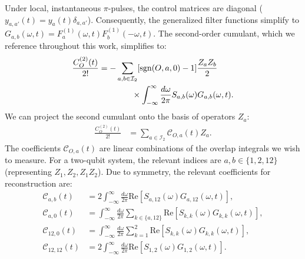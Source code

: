\documentclass[%
 reprint,
superscriptaddress,
 amsmath,amssymb,
 aps,
pra,
]{revtex4-2}
\begin{document}
Under local, instantaneous $\pi$-pulses, the control matrices are diagonal ($y_{a,a'}(t) = y_a(t)\delta_{a,a'}$). Consequently, the generalized filter functions simplify to $G_{a,b}(\omega,t) = F^{(1)}_a(\omega,t)F^{(1)}_b(-\omega,t)$. The second-order cumulant, which we reference throughout this work, simplifies to:
\begin{align}
    \frac{C_{O}^{(2)}(t)}{2!}&=-\sum_{a,b\in\mathcal{I}_2}[\text{sgn}(O,a,0)-1]\frac{Z_aZ_b}{2}\notag\\
    &\qquad\qquad\times\int_{-\infty}^{\infty}\frac{d\omega}{2\pi}S_{a,b}(\omega)G_{a,b}(\omega,t).
\end{align}
We can project the second cumulant onto the basis of operators $Z_a$:
\begin{align}
    \frac{C_O^{(2)}(t)}{2!}&=\sum_{a\in\mathcal{I}_2}\mathcal{C}_{O,a}(t)Z_a.
\end{align}
The coefficients $\mathcal{C}_{O,a}(t)$ are linear combinations of the overlap integrals we wish to measure. For a two-qubit system, the relevant indices are $a,b \in \{1, 2, 12\}$ (representing $Z_1, Z_2, Z_1Z_2$). Due to symmetry, the relevant coefficients for reconstruction are:
\begin{align}\label{eq::coeff1}
    \mathcal{C}_{a,b}(t)&=2\int_{-\infty}^\infty \frac{d\omega}{2\pi}\text{Re}\left[S_{a,12}(\omega)G_{a,12}(\omega,t)\right],\\
    \mathcal{C}_{a,0}(t)&=\int_{-\infty}^\infty \frac{d\omega}{2\pi}\sum_{k\in \{a,12\}}\text{Re}\left[S_{k,k}(\omega)G_{k,k}(\omega,t)\right],\\
    \mathcal{C}_{12,0}(t)&=\int_{-\infty}^\infty \frac{d\omega}{2\pi}\sum_{k=1}^2\text{Re}\left[S_{k,k}(\omega)G_{k,k}(\omega,t)\right],\\
    \mathcal{C}_{12,12}(t)&=2\int_{-\infty}^\infty \frac{d\omega}{2\pi}\text{Re}\left[S_{1,2}(\omega)G_{1,2}(\omega,t)\right].\label{eq::coeff4}
\end{align}
\end{document}
